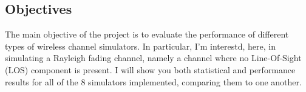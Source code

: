 \subsection{Objectives} %
\label{subsec:objectives}

The main objective of the project is to evaluate the performance of different types of wireless channel simulators. In particular, I'm interestd, here, in simulating a Rayleigh fading channel, namely a channel where no Line-Of-Sight (LOS) component is present. I will show you both statistical and performance results for all of the 8 simulators implemented, comparing them to one another.